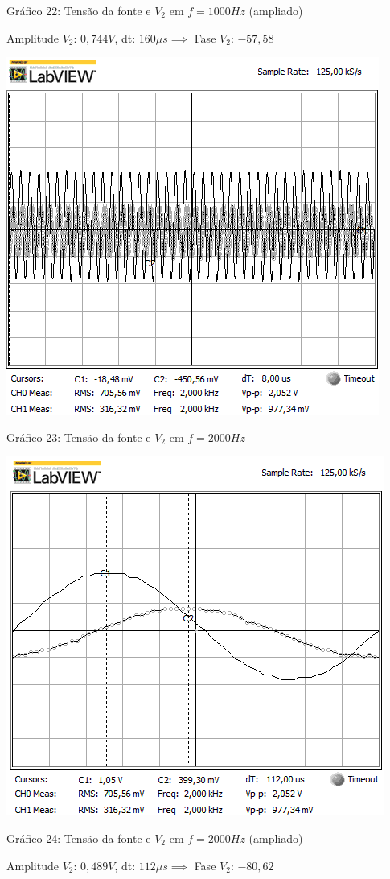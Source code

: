 \begin{center}
Gráfico 22: Tensão da fonte e $V_2$ em $f=1000Hz$ (ampliado)
\end{center}

Amplitude $V_2$: $0,744V$, dt: $160\mu s\implies$ Fase $V_2$: $-57,58$\textdegree

\newpage
\begin{table}[h]
\centering
\includegraphics[scale=0.725]{rgadicoas/rgadicoa8}
\end{table}

\begin{center}
Gráfico 23: Tensão da fonte e $V_2$ em $f=2000Hz$ 
\end{center}

\begin{table}[h]
\centering
\includegraphics[scale=0.725]{rgadicoas/rgadicoa8-2}
\end{table}

\begin{center}
Gráfico 24: Tensão da fonte e $V_2$ em $f=2000Hz$ (ampliado)
\end{center}

Amplitude $V_2$: $0,489V$, dt: $112\mu s\implies$ Fase $V_2$: $-80,62$\textdegree